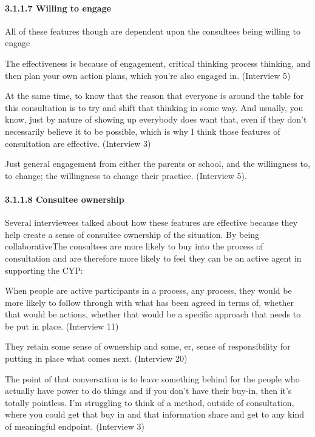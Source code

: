 \documentclass[
]{article}
\begin{document}
\hypertarget{willing-to-engage}{%
\paragraph{3.1.1.7 Willing to engage}\label{willing-to-engage}}

All of these features though are dependent upon the consultees being
willing to engage

The effectiveness is because of engagement, critical thinking process
thinking, and then plan your own action plans, which you're also engaged
in. (Interview 5)

At the same time, to know that the reason that everyone is around the
table for this consultation is to try and shift that thinking in some
way. And usually, you know, just by nature of showing up everybody does
want that, even if they don't necessarily believe it to be possible,
which is why I think those features of consultation are effective.
(Interview 3)

Just general engagement from either the parents or school, and the
willingness to, to change; the willingness to change their practice.
(Interview 5).

\hypertarget{consultee-ownership}{%
\paragraph{3.1.1.8 Consultee ownership}\label{consultee-ownership}}

Several interviewees talked about how these features are effective
because they help create a sense of consultee ownership of the
situation. By being collaborativeThe consultees are more likely to buy
into the process of consultation and are therefore more likely to feel
they can be an active agent in supporting the CYP:

When people are active participants in a process, any process, they
would be more likely to follow through with what has been agreed in
terms of, whether that would be actions, whether that would be a
specific approach that needs to be put in place. (Interview 11)

They retain some sense of ownership and some, er, sense of
responsibility for putting in place what comes next. (Interview 20)

The point of that conversation is to leave something behind for the
people who actually have power to do things and if you don't have their
buy-in, then it's totally pointless. I'm struggling to think of a
method, outside of consultation, where you could get that buy in and
that information share and get to any kind of meaningful endpoint.
(Interview 3)
\end{document}
